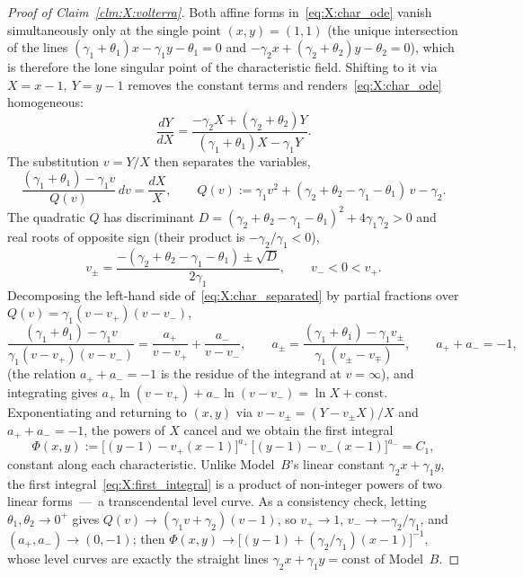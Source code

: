 \begin{proof}[Proof of Claim~\ref{clm:X:volterra}]
Both affine forms in~\eqref{eq:X:char_ode} vanish simultaneously only at the single
point $(x,y)=(1,1)$ (the unique intersection of the lines
$(\gamma_1+\theta_1)x-\gamma_1 y-\theta_1=0$ and
$-\gamma_2 x+(\gamma_2+\theta_2)y-\theta_2=0$), which is therefore the lone singular
point of the characteristic field. Shifting to it via $X=x-1,\ Y=y-1$ removes the
constant terms and renders~\eqref{eq:X:char_ode} homogeneous:
\begin{equation}
    \frac{dY}{dX}
    = \frac{-\gamma_2 X + (\gamma_2+\theta_2)Y}{(\gamma_1+\theta_1)X - \gamma_1 Y}.
    \label{eq:X:char_shifted}
\end{equation}
The substitution $v=Y/X$ then separates the variables,
\begin{equation}
    \frac{(\gamma_1+\theta_1)-\gamma_1 v}{Q(v)}\,dv = \frac{dX}{X},
    \qquad
    Q(v) := \gamma_1 v^2 + (\gamma_2+\theta_2-\gamma_1-\theta_1)\,v - \gamma_2 .
    \label{eq:X:char_separated}
\end{equation}
The quadratic $Q$ has discriminant
$D=(\gamma_2+\theta_2-\gamma_1-\theta_1)^2+4\gamma_1\gamma_2>0$ and real roots of opposite
sign (their product is $-\gamma_2/\gamma_1<0$),
\begin{equation}
    v_{\pm}=\frac{-(\gamma_2+\theta_2-\gamma_1-\theta_1)\pm\sqrt{D}}{2\gamma_1},
    \qquad v_-<0<v_+ .
    \label{eq:X:roots}
\end{equation}
Decomposing the left-hand side of~\eqref{eq:X:char_separated} by partial fractions over
$Q(v)=\gamma_1(v-v_+)(v-v_-)$,
\begin{equation}
    \frac{(\gamma_1+\theta_1)-\gamma_1 v}{\gamma_1(v-v_+)(v-v_-)}
    = \frac{a_+}{v-v_+} + \frac{a_-}{v-v_-},
    \qquad
    a_{\pm}=\frac{(\gamma_1+\theta_1)-\gamma_1 v_{\pm}}{\gamma_1\,(v_{\pm}-v_{\mp})},
    \qquad a_++a_-=-1,
    \label{eq:X:apm}
\end{equation}
(the relation $a_++a_-=-1$ is the residue of the integrand at $v=\infty$), and
integrating gives $a_+\ln(v-v_+)+a_-\ln(v-v_-)=\ln X+\mathrm{const}$. Exponentiating and
returning to $(x,y)$ via $v-v_\pm=(Y-v_\pm X)/X$ and $a_++a_-=-1$, the powers of $X$
cancel and we obtain the first integral
\begin{equation}
    \Phi(x,y)
    := \bigl[(y-1)-v_+(x-1)\bigr]^{a_+}\,\bigl[(y-1)-v_-(x-1)\bigr]^{a_-}
    = C_1,
    \label{eq:X:first_integral}
\end{equation}
constant along each characteristic. Unlike Model~$B$'s linear constant
$\gamma_2 x+\gamma_1 y$, the first integral~\eqref{eq:X:first_integral} is a product of
non-integer powers of two linear forms~---~a transcendental level curve. As a
consistency check, letting $\theta_1,\theta_2\to0^+$ gives
$Q(v)\to(\gamma_1 v+\gamma_2)(v-1)$, so $v_+\to1$, $v_-\to-\gamma_2/\gamma_1$, and
$(a_+,a_-)\to(0,-1)$; then
$\Phi(x,y)\to\bigl[(y-1)+(\gamma_2/\gamma_1)(x-1)\bigr]^{-1}$, whose level curves are
exactly the straight lines $\gamma_2 x+\gamma_1 y=\mathrm{const}$ of Model~$B$.


\end{proof}
